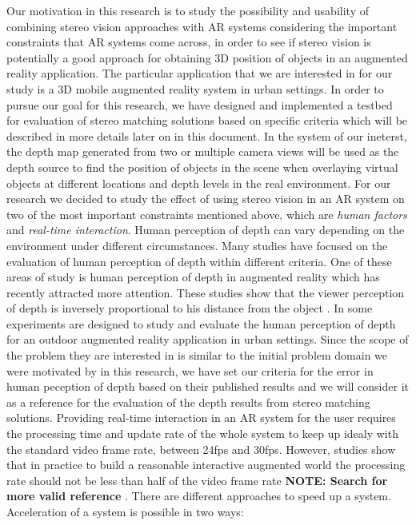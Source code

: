 \documentclass[dvips,letterpaper,12pt]{report}
\begin{document}
Our motivation in this research is to study the possibility and usability of combining stereo vision approaches with AR systems considering the important constraints that AR systems come across, 
in order to see if stereo vision 
is potentially a good approach for obtaining 3D position of objects in an augmented reality application. The particular application that we are interested in for
our study is a 3D mobile augmented reality system in urban settings. In order to pursue our goal for this research, we have designed and implemented a testbed for evaluation of
stereo matching solutions based on specific criteria which will be described in more details later on in this document.
In the system of our ineterst, the depth map generated from two or multiple camera views will be used as the depth source to find the position of objects in the scene when
overlaying virtual objects at different locations and depth levels in the real environment. For our research we decided to study the effect of using stereo vision in an AR 
system on two of the most important constraints mentioned above, which are {\it human factors} and {\it real-time interaction}. {\newline}
Human perception of depth can vary depending on the environment under different circumstances. Many studies have focused on the evaluation of human perception of depth within different
criteria. One of these areas of study is human perception of depth in augmented reality which has recently attracted more attention. These studies show that the viewer perception of depth
is inversely proportional to his distance from the object \cite{kru10,swa07,jer05,liv05}. In \cite{swa07} some experiments are designed to study and evaluate the human
perception of depth for an outdoor augmented reality application in urban settings. Since the scope of the problem they are interested in is similar to the initial problem domain we 
were motivated by in this research, we have set our criteria for the error in human peception of depth based on their published results and we will consider it as a reference for the 
evaluation of the depth results from stereo matching solutions. \newline
Providing real-time interaction in an AR system for the user requires the processing time and update rate of the whole system to keep up idealy with the standard video frame rate, between 24fps and 
30fps. However, studies show that in practice to build a reasonable interactive augmented world the processing rate should not be less than half of the video frame rate  \textbf{NOTE: Search for more
valid reference} \cite{spe}. There are different approaches to speed up a system. Acceleration of a system is possible in two ways:
\end{document}
